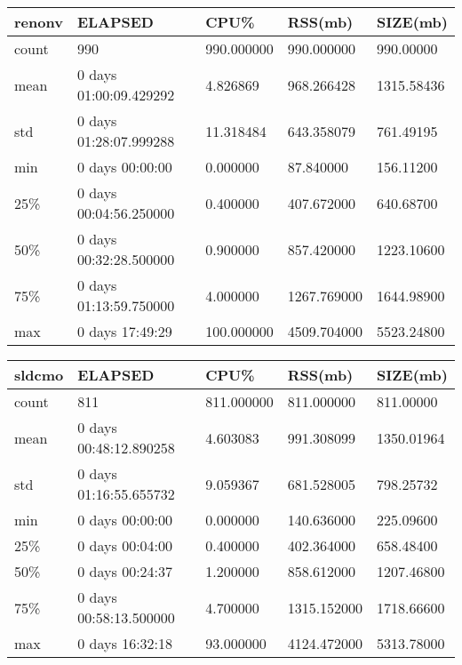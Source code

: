 \documentclass{article}
\begin{document}
\begin{table}[H]
\begin{tabular}{|l|l|l|l|l|}
\hline renonv& ELAPSED&   CPU\%&  RSS(mb)&   SIZE(mb) \\
\hline count&    990& 990.000000&  990.000000&  990.00000 \\
\hline mean&  0 days 01:00:09.429292&  4.826869&  968.266428& 1315.58436 \\
\hline std&  0 days 01:28:07.999288&  11.318484&  643.358079&  761.49195 \\
\hline min&   0 days 00:00:00&  0.000000&  87.840000&  156.11200 \\
\hline 25\%&  0 days 00:04:56.250000&  0.400000&  407.672000&  640.68700 \\
\hline 50\%&  0 days 00:32:28.500000&  0.900000&  857.420000& 1223.10600 \\
\hline 75\%&  0 days 01:13:59.750000&  4.000000& 1267.769000& 1644.98900 \\
\hline max&   0 days 17:49:29& 100.000000& 4509.704000& 5523.24800 \\
\hline 
\end{tabular}
\label{TABLE-SessionSizerenonv}
\end{table}

\begin{table}[H]
\begin{tabular}{|l|l|l|l|l|}
\hline sldcmo& ELAPSED&   CPU\%&  RSS(mb)&   SIZE(mb) \\
\hline count&    811& 811.000000&  811.000000&  811.00000 \\
\hline mean&  0 days 00:48:12.890258&  4.603083&  991.308099& 1350.01964 \\
\hline std&  0 days 01:16:55.655732&  9.059367&  681.528005&  798.25732 \\
\hline min&   0 days 00:00:00&  0.000000&  140.636000&  225.09600 \\
\hline 25\%&   0 days 00:04:00&  0.400000&  402.364000&  658.48400 \\
\hline 50\%&   0 days 00:24:37&  1.200000&  858.612000& 1207.46800 \\
\hline 75\%&  0 days 00:58:13.500000&  4.700000& 1315.152000& 1718.66600 \\
\hline max&   0 days 16:32:18&  93.000000& 4124.472000& 5313.78000 \\
\hline 
\end{tabular}
\label{TABLE-SessionSizesldcmo}
\end{table}
\end{document}
